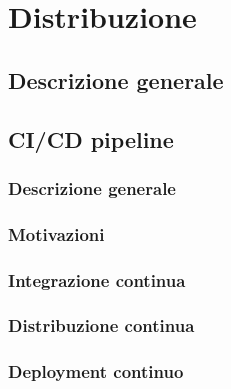 \chapter{Distribuzione}
\section{Descrizione generale}

\section{CI/CD pipeline}
\subsection{Descrizione generale}

\subsection{Motivazioni}

\subsection{Integrazione continua}

\subsection{Distribuzione continua}

\subsection{Deployment continuo}
